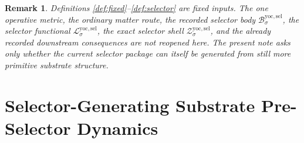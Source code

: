 \documentclass[11pt]{article}
\newcommand{\YoctoSelectorBody}[1]{\mathcal B_{#1}^{\mathrm{yoc,sel}}}
\newcommand{\YoctoSelectorFunctional}[1]{\mathscr L_{#1}^{\mathrm{yoc,sel}}}
\newcommand{\YoctoSelectorShell}[1]{\mathcal Z_{#1}^{\mathrm{yoc,sel}}}
\newtheorem{remark}{Remark}
\begin{document}
\begin{remark}
Definitions \ref{def:fixed}--\ref{def:selector} are fixed inputs. The one operative metric, the ordinary matter route, the recorded selector body \(\YoctoSelectorBody{\sigma}\), the selector functional \(\YoctoSelectorFunctional{\sigma}\), the exact selector shell \(\YoctoSelectorShell{\sigma}\), and the already recorded downstream consequences are not reopened here. The present note asks only whether the current selector package can itself be generated from still more primitive substrate structure.
\end{remark}

\section{Selector-Generating Substrate Pre-Selector Dynamics}
\end{document}
